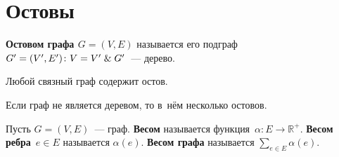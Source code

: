 \section{Остовы}
 \textbf{Остовом графа $G = (V, E)$} называется его подграф~$G' = (V', E') \colon V = V' \mathrel{\&} G'$~--- дерево.

\begin{statement}
Любой связный граф содержит остов.
\end{statement}

\begin{statement}
Если граф не является деревом, то в~нём несколько остовов.
\end{statement}

Пусть $G = (V, E)$~--- граф.
\textbf{Весом} называется функция~$\alpha \colon E \to \mathbb R^+$.
\textbf{Весом ребра}~$e \in E$ называется $\alpha(e)$.
 \textbf{Весом графа} называется $\displaystyle \sum_{e \in E} \alpha(e)$.

